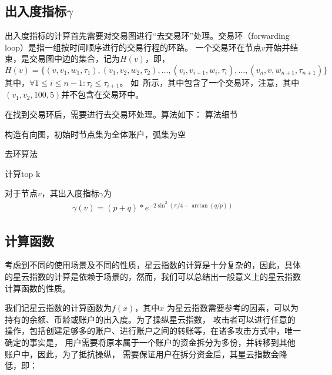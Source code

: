 \subsection*{出入度指标$\gamma$}
出入度指标的计算首先需要对交易图进行“去交易环”处理。交易环（forwarding loop）是指一组按时间顺序进行的交易行程的环路。
一个交易环在节点$v$开始并结束，是交易图中边的集合，记为$H(v)$，即，
\[
H(v) = \{(v, v_1, w_1, \tau_1), (v_1, v_2, w_2, \tau_2), \dots, (v_i, v_{i+1}, w_{i}, \tau_i), \dots, (v_n, v, w_{n+1}, \tau_{n+1})\}
\]
\noindent 其中，$\forall 1\le i \le {n-1} : \tau_i \le \tau_{i+1} $。
\noindent 如~所示，其中包含了一个交易环，注意，其中$(v_1, v_2, 100, 5)$并不包含在交易环中。



在找到交易环后，需要进行去交易环处理。算法如下：{\color{red} 算法细节}

\begin{algorithm}[H]
\SetAlgoLined
{}
 构造有向图，初始时节点集为全体账户，弧集为空\;
 \caption{去环算法}
\end{algorithm}




{\color{red} 计算top k}

对于节点$v$，其出入度指标$\gamma$为
\begin{align}
\gamma(v) = (p + q) * e^{-2\sin^2{(\pi/4 - \arctan(q/p))}}
\end{align}

\subsection*{计算函数}
考虑到不同的使用场景及不同的性质，星云指数的计算是十分复杂的，因此，具体的星云指数的计算是依赖于场景的，然而，我们可以总结出一般意义上的星云指数计算函数的性质。

我们记星云指数的计算函数为\(f(x)\)，其中\(x\)
为星云指数需要参考的因素，可以为持有的余额、币龄或账户的出入度。为了操纵星云指数，
攻击者可以进行任意的操作，包括创建足够多的账户、进行账户之间的转账等，在诸多攻击方式中，唯一确定的事实是，
{\color{red} 用户需要将原本属于一个账户的资金拆分为多份，并转移到其他账户中}，因此，为了抵抗操纵，
需要保证用户在拆分资金后，其星云指数会降低，即：

